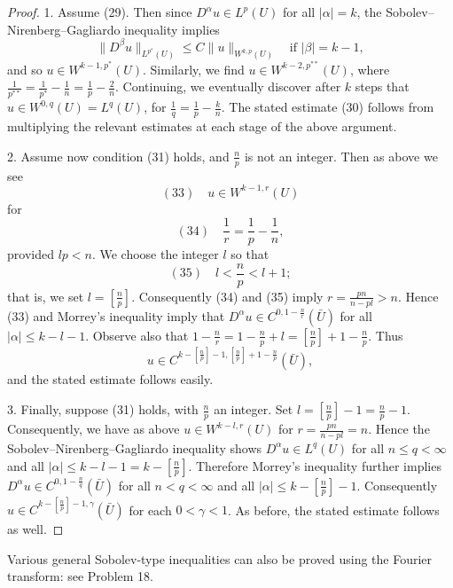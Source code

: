 \begin{proof}
1. Assume (29). Then since $D^\alpha u \in L^p(U)$ for all $|\alpha| = k$, the Sobolev--Nirenberg--Gagliardo inequality implies
$$\|D^\beta u\|_{L^{p^*}(U)} \le C\|u\|_{W^{k,p}(U)} \quad \text{if } |\beta| = k-1,$$
and so $u \in W^{k-1,p^*}(U)$. Similarly, we find $u \in W^{k-2,p^{**}}(U)$, where $\frac{1}{p^{**}} = \frac{1}{p^*} - \frac{1}{n} = \frac{1}{p} - \frac{2}{n}$. Continuing, we eventually discover after $k$ steps that $u \in W^{0,q}(U) = L^q(U)$, for $\frac{1}{q} = \frac{1}{p} - \frac{k}{n}$. The stated estimate (30) follows from multiplying the relevant estimates at each stage of the above argument.

2. Assume now condition (31) holds, and $\frac{n}{p}$ is not an integer. Then as above we see
$$(33) \quad u \in W^{k-1,r}(U)$$
for
$$(34) \quad \frac{1}{r} = \frac{1}{p} - \frac{1}{n},$$
provided $lp < n$. We choose the integer $l$ so that
$$(35) \quad l < \frac{n}{p} < l+1;$$
that is, we set $l = \left[\frac{n}{p}\right]$. Consequently (34) and (35) imply $r = \frac{pn}{n-pl} > n$. Hence (33) and Morrey's inequality imply that $D^\alpha u \in C^{0,1-\frac{n}{r}}(\bar{U})$ for all $|\alpha| \le k - l - 1$. Observe also that $1 - \frac{n}{r} = 1 - \frac{n}{p} + l = \left[\frac{n}{p}\right] + 1 - \frac{n}{p}$. Thus
$$u \in C^{k-\left[\frac{n}{p}\right]-1,\left[\frac{n}{p}\right]+1-\frac{n}{p}}(\bar{U}),$$
and the stated estimate follows easily.

3. Finally, suppose (31) holds, with $\frac{n}{p}$ an integer. Set $l = \left[\frac{n}{p}\right]-1 = \frac{n}{p}-1$. Consequently, we have as above $u \in W^{k-l,r}(U)$ for $r = \frac{pn}{n-pl} = n$. Hence the Sobolev--Nirenberg--Gagliardo inequality shows $D^\alpha u \in L^q(U)$ for all $n \le q < \infty$ and all $|\alpha| \le k-l-1 = k-\left[\frac{n}{p}\right]$. Therefore Morrey's inequality further implies $D^\alpha u \in C^{0,1-\frac{n}{q}}(\bar U)$ for all $n < q < \infty$ and all $|\alpha| \le k-\left[\frac{n}{p}\right]-1$. Consequently $u \in C^{k-\left[\frac{n}{p}\right]-1,\gamma}(\bar U)$ for each $0 < \gamma < 1$. As before, the stated estimate follows as well.
\end{proof}

\begin{remark}
\label{rem:general-sobolev-fourier-remark}
Various general Sobolev-type inequalities can also be proved using the Fourier transform: see Problem 18.
\end{remark}

